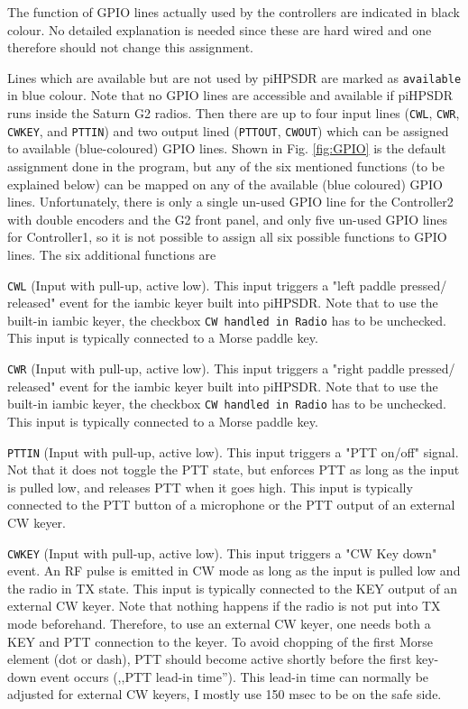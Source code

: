 \documentclass[12pt]{book}
\def\rett#1{\texttt{\color{red}#1}}
\def\bltt#1{\texttt{\color{blue}#1}}
\def\pH{pi\-HPSDR\xspace}
\begin{document}
The function of GPIO lines actually used by the controllers are indicated in black colour. No detailed
explanation is needed since these are hard wired and one therefore should not change this assignment.

Lines which are available but are not used by \pH are marked as \texttt{available} in blue colour.
{\color{red} Note that no GPIO lines are accessible and available if \pH runs inside the Saturn G2 radios.}
Then there are up to four input lines (\texttt{CWL}, \texttt{CWR}, \texttt{CWKEY}, and \texttt{PTTIN})
and two output lined (\texttt{PTTOUT}, \texttt{CWOUT}) which can be assigned to available (blue-coloured)
GPIO lines. Shown in Fig. \ref{fig:GPIO} is the default assignment done in the program, but any of the
six mentioned functions (to be explained below) can be mapped on any of the available (blue coloured)
GPIO lines. Unfortunately, there is only a single un-used GPIO line for the Controller2 with double
encoders and the G2 front panel, and only five un-used GPIO lines for Controller1, so it is not possible
to assign all six possible functions to GPIO lines. The six additional functions are

\rett{CWL} (Input with pull-up, active low). This input triggers a "left paddle pressed/
released" event for the
iambic keyer built into \pH. Note that to use the built-in iambic keyer, the checkbox
\bltt{CW handled in Radio} has to be unchecked. This input is typically connected to
a Morse paddle key.

\rett{CWR} (Input with pull-up, active low). This input triggers a "right paddle pressed/
released" event for the
iambic keyer built into \pH. Note that to use the built-in iambic keyer, the checkbox
\bltt{CW handled in Radio} has to be unchecked. This input is typically connected to
a Morse paddle key.


\rett{PTTIN} (Input with pull-up, active low). This input triggers a "PTT on/off" signal.
Not that it does not toggle the PTT state, but enforces PTT as long as the input is pulled low,
and releases PTT when it goes high. This input is typically connected to the PTT button of
a microphone or the PTT output of an external CW keyer.

\rett{CWKEY} (Input with pull-up, active low). This input triggers a "CW Key down" event. An
RF pulse is emitted in CW mode as long as the input is pulled low and the radio in TX state.
This input is typically connected to the KEY output of an external CW keyer.  Note that  nothing
happens if the radio is not put into TX mode beforehand. Therefore, to use an external CW keyer,
one needs both a KEY and PTT connection to the keyer. To avoid chopping of the first Morse element
(dot or dash), PTT should become active shortly before the first key-down event occurs (,,PTT
lead-in time''). This lead-in time can normally be adjusted for external CW keyers, I mostly use
150 msec to be on the safe side.
\end{document}

